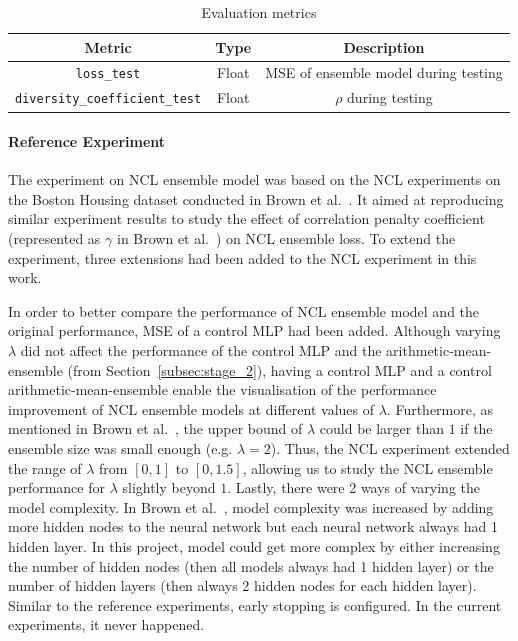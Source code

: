\begin{table}[H]
    \centering
    \begin{tabular}{|c|c|c|}
        \hline
        Metric & Type & Description \\
        \hline
        \small\texttt{loss\_test} & Float & MSE of ensemble model during testing \\
        \hline
        \small\texttt{diversity\_coefficient\_test} & Float & $\rho$ during testing \\
        \hline
    \end{tabular}
    \caption{Evaluation metrics}
    \label{table:experiment_3_metric}
\end{table}


\paragraph{Reference Experiment}
The experiment on NCL ensemble model was based on the NCL experiments on the Boston Housing dataset conducted in Brown et al.\ \cite{brown2005managing}. It aimed at reproducing similar experiment results to study the effect of correlation penalty coefficient (represented as $\gamma$ in Brown et al.\ \cite{brown2005managing}) on NCL ensemble loss. To extend the experiment, three extensions had been added to the NCL experiment in this work. 

In order to better compare the performance of NCL ensemble model and the original performance, MSE of a control MLP had been added. Although varying $\lambda$ did not affect the performance of the control MLP and the arithmetic-mean-ensemble (from Section~\ref{subsec:stage_2}), having a control MLP and a control arithmetic-mean-ensemble enable the visualisation of the performance improvement of NCL ensemble models at different values of $\lambda$. Furthermore, as mentioned in Brown et al.\ \cite{brown2005managing}, the upper bound of $\lambda$ could be larger than $1$ if the ensemble size was small enough (e.g. $\lambda = 2$). Thus, the NCL experiment extended the range of $\lambda$ from $[0, 1]$ to $[0, 1.5]$, allowing us to study the NCL ensemble performance for $\lambda$ slightly beyond $1$. Lastly, there were 2 ways of varying the model complexity. In Brown et al.\ \cite{brown2005managing}, model complexity was increased by adding more hidden nodes to the neural network but each neural network always had 1 hidden layer. In this project, model could get more complex by either increasing the number of hidden nodes (then all models always had 1 hidden layer) or the number of hidden layers (then always 2 hidden nodes for each hidden layer). Similar to the reference experiments, early stopping is configured. In the current experiments, it never happened. 

